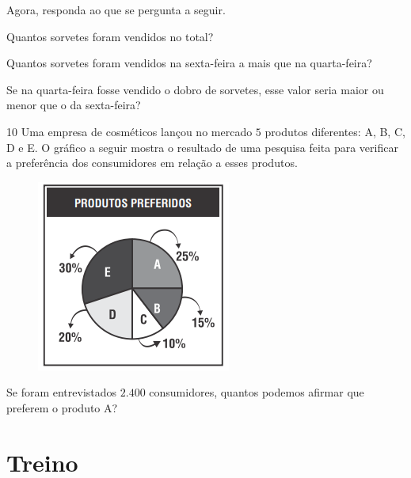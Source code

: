 Agora, responda ao que se pergunta a seguir.

\begin{escolha}
\item Quantos sorvetes foram vendidos no total?\\

\item Quantos sorvetes foram vendidos na sexta-feira a mais que na quarta-feira?\\

\item Se na quarta-feira fosse vendido o dobro de sorvetes, esse valor seria
maior ou menor que o da sexta-feira?\\
\end{escolha}

\num{10} Uma empresa de cosméticos lançou no mercado $5$ produtos diferentes:
A, B, C, D e E. O gráfico a seguir mostra o resultado de uma pesquisa feita para
verificar a preferência dos consumidores em relação a esses produtos.

\begin{figure}[H]
\centering\includegraphics[width=2.51181in,height=2.47708in]{./imgSAEB_6_MAT/media/image88.png}
\end{figure}

Se foram entrevistados $2.400$ consumidores, quantos podemos afirmar que preferem o produto A?


\section*{Treino}

